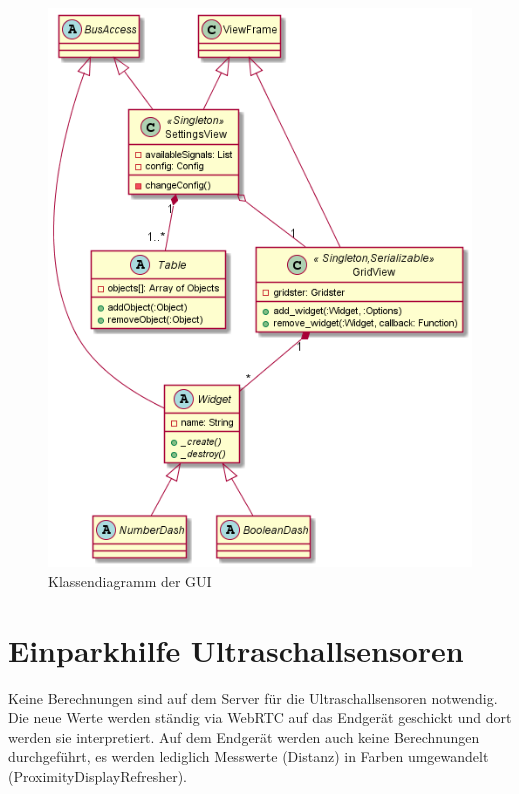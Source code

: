 \documentclass[entwurf.tex]{subfiles}
\begin{document}
		\begin{figure}[H]
  			\begin{center}
 				\includegraphics[width=\textwidth]{diagrams/UI.png}
  				\caption{Klassendiagramm der GUI}
  			\end{center}
  		\end{figure}
  	
		\newpage
		\section{Einparkhilfe Ultraschallsensoren}
		Keine Berechnungen sind auf dem Server für die Ultraschallsensoren notwendig. Die neue Werte werden ständig via WebRTC auf das Endgerät geschickt und dort werden sie interpretiert. Auf dem Endgerät werden auch keine Berechnungen durchgeführt, es werden lediglich Messwerte (Distanz) in Farben umgewandelt (ProximityDisplayRefresher).
\end{document}
